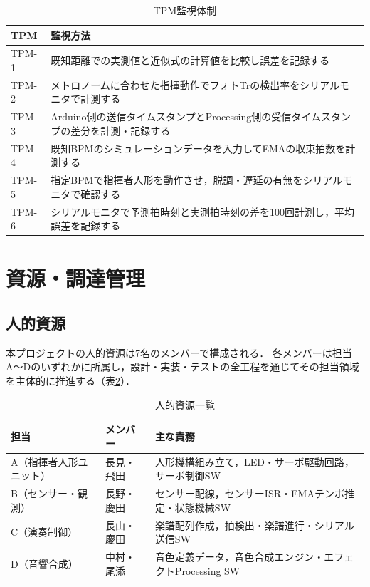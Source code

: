 \begin{table}[H]
  \centering
  \caption{TPM監視体制}
  \label{tab:tpm-monitor}
  \begin{tabularx}{\linewidth}{lX}
    \toprule
    TPM & 監視方法 \\
    \midrule
    TPM-1 & 既知距離での実測値と近似式の計算値を比較し誤差を記録する \\
    TPM-2 & メトロノームに合わせた指揮動作でフォトTrの検出率をシリアルモニタで計測する \\
    TPM-3 & Arduino側の送信タイムスタンプとProcessing側の受信タイムスタンプの差分を計測・記録する \\
    TPM-4 & 既知BPMのシミュレーションデータを入力してEMAの収束拍数を計測する \\
    TPM-5 & 指定BPMで指揮者人形を動作させ，脱調・遅延の有無をシリアルモニタで確認する \\
    TPM-6 & シリアルモニタで予測拍時刻と実測拍時刻の差を100回計測し，平均誤差を記録する \\
    \bottomrule
  \end{tabularx}
\end{table}

\section{資源・調達管理}

\subsection{人的資源}

本プロジェクトの人的資源は7名のメンバーで構成される．
各メンバーは担当A〜Dのいずれかに所属し，設計・実装・テストの全工程を通じてその担当領域を主体的に推進する（表\ref{tab:human-resource}）．

\begin{table}[H]
  \centering
  \caption{人的資源一覧}
  \label{tab:human-resource}
  \begin{tabularx}{\linewidth}{llX}
    \toprule
    担当 & メンバー & 主な責務 \\
    \midrule
    A（指揮者人形ユニット） & 長見・飛田 & 人形機構組み立て，LED・サーボ駆動回路，サーボ制御SW \\
    B（センサー・観測）     & 長野・慶田 & センサー配線，センサーISR・EMAテンポ推定・状態機械SW \\
    C（演奏制御）           & 長山・慶田 & 楽譜配列作成，拍検出・楽譜進行・シリアル送信SW \\
    D（音響合成）           & 中村・尾添 & 音色定義データ，音色合成エンジン・エフェクトProcessing SW \\
    \bottomrule
  \end{tabularx}
\end{table}

